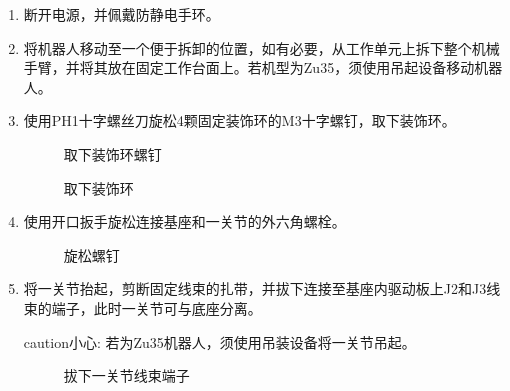 \documentclass[a4paper,11pt,english,openany,oneside]{sphinxmanual}
\begin{document}
\sphinxAtStartPar
{}
\begin{enumerate}
%
\item {} 
\sphinxAtStartPar
断开电源，并佩戴防静电手环。

\item {} 
\sphinxAtStartPar
将机器人移动至一个便于拆卸的位置，如有必要，从工作单元上拆下整个机械手臂，并将其放在固定工作台面上。若机型为Zu35，须使用吊起设备移动机器人。

\item {} 
\sphinxAtStartPar
使用PH1十字螺丝刀旋松4颗固定装饰环的M3十字螺钉，取下装饰环。

\begin{figure}[H]
\centering
\capstart

\noindent{}
\caption{取下装饰环螺钉}\label{\detokenize{_u66f4_u6362_u57fa_u5ea7:id9}}\end{figure}

\begin{figure}[H]
\centering
\capstart

\noindent{}
\caption{取下装饰环}\label{\detokenize{_u66f4_u6362_u57fa_u5ea7:id10}}\end{figure}

\item {} 
\sphinxAtStartPar
使用开口扳手旋松连接基座和一关节的外六角螺栓。

\begin{figure}[H]
\centering
\capstart

\noindent{}
\caption{旋松螺钉}\label{\detokenize{_u66f4_u6362_u57fa_u5ea7:id11}}\end{figure}

\item {} 
\sphinxAtStartPar
将一关节抬起，剪断固定线束的扎带，并拔下连接至基座内驱动板上J2和J3线束的端子，此时一关节可与底座分离。

\begin{sphinxadmonition}{caution}{小心:}
\sphinxAtStartPar
若为Zu35机器人，须使用吊装设备将一关节吊起。
\end{sphinxadmonition}

\begin{figure}[H]
\centering
\capstart

\noindent{}
\caption{拔下一关节线束端子}\label{\detokenize{_u66f4_u6362_u57fa_u5ea7:id12}}\end{figure}


\end{enumerate}
\end{document}
